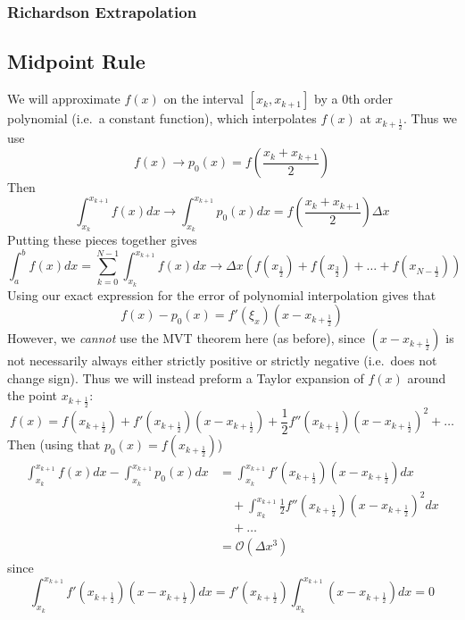 \documentclass[12pt]{article}
\theoremstyle{definition}
\theoremstyle{definition}
\begin{document}
\subsubsection{Richardson Extrapolation}

\subsection{Midpoint Rule}
We will approximate $f(x)$ on the interval $[x_k,x_{k+1}]$ by a $0$th order polynomial (i.e.\ a constant function), which interpolates $f(x)$ at $x_{k + \frac{1}{2}}$. Thus we use
\begin{equation}
	f(x) \to p_0(x) = f\left(\frac{x_k + x_{k+1}}{2}\right)
\end{equation}
Then
\begin{equation}
	\int_{x_k}^{x_{k+1}} f(x) dx \to \int_{x_k}^{x_{k+1}} p_0(x)dx = f\left(\frac{x_k + x_{k+1}}{2}\right) \Delta x
\end{equation}
Putting these pieces together gives
\begin{equation}
	\int_a^b f(x)dx = \sum_{k=0}^{N-1} \int_{x_k}^{x_{k+1}} f(x)dx \to \Delta x \left( f(x_{\frac{1}{2}}) + f(x_{\frac{3}{2}}) + \ldots + f(x_{N - \frac{1}{2}})\right)
\end{equation}
Using our exact expression for the error of polynomial interpolation gives that
\begin{equation}
	f(x) - p_0(x) = f'(\xi_x)(x - x_{k + \frac{1}{2}})
\end{equation}
However, we \emph{cannot} use the MVT theorem here (as before), since $(x - x_{k + \frac{1}{2}})$ is not necessarily always either strictly positive or strictly negative (i.e.\ does not change sign). Thus we will instead preform a Taylor expansion of $f(x)$ around the point $x_{k + \frac{1}{2}}$:
\begin{equation}
	f(x) = f(x_{k + \frac{1}{2}}) + f'(x_{k + \frac{1}{2}})(x - x_{k + \frac{1}{2}}) + \frac{1}{2}f''(x_{k + \frac{1}{2}})(x - x_{k + \frac{1}{2}})^2 + \ldots
\end{equation}
Then (using that $p_0(x) = f(x_{k + \frac{1}{2}})$)
\begin{align*}
	\int_{x_k}^{x_{k+1}}f(x)dx - \int_{x_k}^{x_{k+1}}p_0(x)dx &=
	\int_{x_k}^{x_{k+1}} f'(x_{k + \frac{1}{2}})(x - x_{k + \frac{1}{2}}) dx \\
	&\quad + \int_{x_k}^{x_{k+1}} \frac{1}{2}f''(x_{k + \frac{1}{2}})(x - x_{k + \frac{1}{2}})^2 dx \\
	&\quad + \ldots \\
	&= \mathcal{O}(\Delta x^3)
\end{align*}
since 
\begin{equation}
	\int_{x_k}^{x_{k+1}} f'(x_{k + \frac{1}{2}})(x - x_{k + \frac{1}{2}}) dx = f'(x_{k + \frac{1}{2}}) \int_{x_k}^{x_{k+1}} (x - x_{k + \frac{1}{2}}) dx=0
\end{equation}
\end{document}

